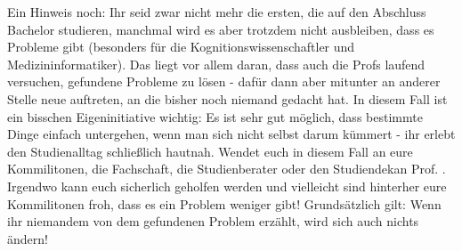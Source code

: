 \pagebreak
  Ein Hinweis noch: Ihr seid zwar nicht mehr die ersten, die auf den Abschluss 
  Bachelor studieren, manchmal wird es aber trotzdem nicht ausbleiben, 
  dass es Probleme gibt (besonders für die Kognitionswissenschaftler und 
  Medizininformatiker). Das liegt vor allem daran, dass auch die Profs laufend 
  versuchen, gefundene Probleme zu lösen - 
  dafür dann aber mitunter an anderer Stelle neue auftreten, an die 
  bisher noch niemand gedacht hat. In diesem Fall ist ein bisschen 
  Eigeninitiative wichtig:
  Es ist sehr gut möglich, dass bestimmte Dinge einfach untergehen, wenn 
  man sich nicht selbst darum kümmert - ihr erlebt den Studienalltag 
  schließlich hautnah. 
  Wendet euch in diesem Fall an eure Kommilitonen, die Fachschaft, die 
  Studienberater oder den Studiendekan Prof. \Studiendekan.
  Irgendwo kann euch sicherlich geholfen werden und vielleicht sind hinterher 
  eure Kommilitonen froh, dass es ein Problem weniger gibt! Grundsätzlich gilt: 
  Wenn ihr niemandem von dem gefundenen Problem erzählt, wird sich auch nichts 
  ändern!


